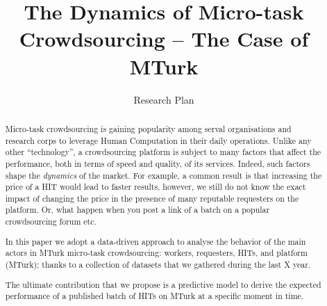 \documentclass{llncs}
\begin{document}
%

\title{The Dynamics of Micro-task Crowdsourcing -- The Case of MTurk}
\subtitle{Research Plan}



\author{}

\maketitle
\begin{abstract}
Micro-task crowdsourcing is gaining popularity among serval organisations and research corps to leverage Human Computation in their daily operations. Unlike any other ``technology'', a crowdsourcing platform is subject to many factors that affect the performance, both in terms of speed and quality, of its services. Indeed, such factors shape the \emph{dynamics} of the market. For example, a common result is that increasing the price of a HIT would lead to faster results, however, we still do not know the exact impact of changing the price in the presence of many reputable requesters on the platform. Or, what happen when you post a link of a batch on a popular crowdsourcing forum etc.

In this paper we adopt a data-driven approach to analyse the behavior of the main actors in MTurk micro-task crowdsourcing: workers, requesters, HITs, and platform (MTurk); thanks to a collection of datasets that we gathered during the last X year.

The ultimate contribution that we propose is a predictive model to derive the expected performance of a published batch of HITs on MTurk at a specific moment in time.

\end{abstract}

%
%
\end{document}
